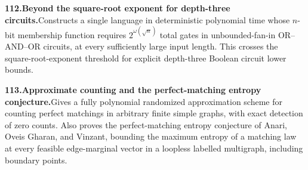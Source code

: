 \documentclass[11pt,a4paper]{article}
\begin{document}
  \par \begin{minipage}{\linewidth}
  \fontsize{10.5}{12.6}\selectfont\RaggedRight
  \hypertarget{result 112}{}
  {\bfseries\textcolor{muted}{112.}\enspace Beyond the square-root exponent for depth-three circuits.}\enspace Constructs a single language in deterministic polynomial time whose $n$-bit membership function requires $2^{\omega(\sqrt n)}$ total gates in unbounded-fan-in OR--AND--OR circuits, at every sufficiently large input length. This crosses the square-root-exponent threshold for explicit depth-three Boolean circuit lower bounds.\par
  \end{minipage}\par\vspace{5pt}



  \par \begin{minipage}{\linewidth}
  \fontsize{10.5}{12.6}\selectfont\RaggedRight
  \hypertarget{result 113}{}
  {\bfseries\textcolor{muted}{113.}\enspace Approximate counting and the perfect-matching entropy conjecture.}\enspace Gives a fully polynomial randomized approximation scheme for counting perfect matchings in arbitrary finite simple graphs, with exact detection of zero counts. Also proves the perfect-matching entropy conjecture of Anari, Oveis Gharan, and Vinzant, bounding the maximum entropy of a matching law at every feasible edge-marginal vector in a loopless labelled multigraph, including boundary points.\par
  \end{minipage}\par\vspace{5pt}
\end{document}
